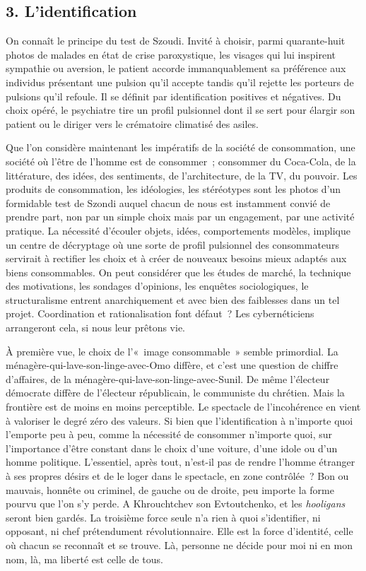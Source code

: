 \documentclass[french,twoside]{book} %
\begin{document}
\subsection[{3. L’identification}]{\textsc{3.} L’identification}
\noindent On connaît le principe du test de Szoudi. Invité à choisir, parmi quarante-huit photos de malades en état de crise paroxystique, les visages qui lui inspirent sympathie ou aversion, le patient accorde immanquablement sa préférence aux individus présentant une pulsion qu’il accepte tandis qu’il rejette les porteurs de pulsions qu’il refoule. Il se définit par identification positives et négatives. Du choix opéré, le psychiatre tire un profil pulsionnel dont il se sert pour élargir son patient ou le diriger vers le crématoire climatisé des asiles.\par
Que l’on considère maintenant les impératifs de la société de consommation, une société où l’être de l’homme est de consommer ; consommer du Coca-Cola, de la littérature, des idées, des sentiments, de l’architecture, de la TV, du pouvoir. Les produits de consommation, les idéologies, les stéréotypes sont les photos d’un formidable test de Szondi auquel chacun de nous est instamment convié de prendre part, non par un simple choix mais par un engagement, par une activité pratique. La nécessité d’écouler objets, idées, comportements modèles, implique un centre de décryptage où une sorte de profil pulsionnel des consommateurs servirait à rectifier les choix et à créer de nouveaux besoins mieux adaptés aux biens consommables. On peut considérer que les études de marché, la technique des motivations, les sondages d’opinions, les enquêtes sociologiques, le structuralisme entrent anarchiquement et avec bien des faiblesses dans un tel projet. Coordination et rationalisation font défaut ? Les cybernéticiens arrangeront cela, si nous leur prêtons vie.\par
À première vue, le choix de l’« image consommable » semble primordial. La ménagère-qui-lave-son-linge-avec-Omo diffère, et c’est une question de chiffre d’affaires, de la ménagère-qui-lave-son-linge-avec-Sunil. De même l’électeur démocrate diffère de l’électeur républicain, le communiste du chrétien. Mais la frontière est de moins en moins perceptible. Le spectacle de l’incohérence en vient à valoriser le degré zéro des valeurs. Si bien que l’identification à n’importe quoi l’emporte peu à peu, comme la nécessité de consommer n’importe quoi, sur l’importance d’être constant dans le choix d’une voiture, d’une idole ou d’un homme politique. L’essentiel, après tout, n’est-il pas de rendre l’homme étranger à ses propres désirs et de le loger dans le spectacle, en zone contrôlée ? Bon ou mauvais, honnête ou criminel, de gauche ou de droite, peu importe la forme pourvu que l’on s’y perde. A Khrouchtchev son Evtoutchenko, et les \emph{hooligans} seront bien gardés. La troisième force seule n’a rien à quoi s’identifier, ni opposant, ni chef prétendument révolutionnaire. Elle est la force d’identité, celle où chacun se reconnaît et se trouve. Là, personne ne décide pour moi ni en mon nom, là, ma liberté est celle de tous.\par
\end{document}
